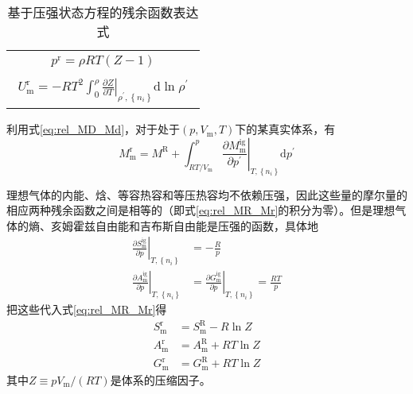 \documentclass[main.tex]{subfiles}
\begin{document}
\setlength\LTleft{0pt}
\setlength\LTright{0pt}
\begin{longtable}{m{\textwidth}}
\caption{基于压强状态方程的残余函数表达式}\label{table:residual_functions_Mr}\\
\hline
\begin{align}
p^\text{r}=\rho RT\left(Z-1\right)
\end{align}\\[-10ex]
\begin{align}
U^\text{r}_\text{m}=-RT^2\int_0^\rho\left.\frac{\partial Z}{\partial T}\right|_{\rho^\prime,\left\{n_i\right\}}\mathrm{d}\ln\rho^\prime
    \end{align}\\
\hline
\end{longtable}


利用式\eqref{eq:rel_MD_Md}，对于处于$\left(p,V_\text{m},T\right)$下的某真实体系，有
\begin{equation}
    \label{eq:rel_MR_Mr}    M^\text{r}_\text{m}=M^\text{R}+\int_{RT/V_\text{m}}^p\left.\frac{\partial M^\text{ig}_\text{m}}{\partial p^\prime}\right|_{T,\left\{n_i\right\}}\mathrm{d}p^\prime
\end{equation}

理想气体的内能、焓、等容热容和等压热容均不依赖压强，因此这些量的摩尔量的相应两种残余函数之间是相等的（即式\eqref{eq:rel_MR_Mr}的积分为零）。但是理想气体的熵、亥姆霍兹自由能和吉布斯自由能是压强的函数，具体地
\begin{align*}
    \left.\frac{\partial S^\text{ig}_\text{m}}{\partial p}\right|_{T,\left\{n_i\right\}} & =-\frac{R}{p}                                                                                      \\
    \left.\frac{\partial A^\text{ig}_\text{m}}{\partial p}\right|_{T,\left\{n_i\right\}} & =\left.\frac{\partial G^\text{ig}_\text{m}}{\partial p}\right|_{T,\left\{n_i\right\}}=\frac{RT}{p}
\end{align*}
把这些代入式\eqref{eq:rel_MR_Mr}得
\begin{align}
    S^\text{r}_\text{m} & =S^\text{R}_\text{m}-R\ln Z  \\
    A^\text{r}_\text{m} & =A^\text{R}_\text{m}+RT\ln Z \\
    G^\text{r}_\text{m} & =G^\text{R}_\text{m}+RT\ln Z
\end{align}
其中$Z\equiv pV_\text{m}/\left(RT\right)$是体系的压缩因子。
\end{document}
